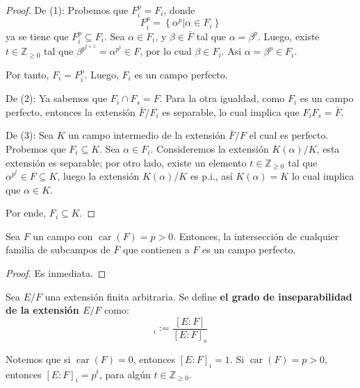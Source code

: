 \documentclass[12pt]{report}
\theoremstyle{largebreak}
\DeclareMathOperator{\car}{car}
\begin{document}
    \begin{proof}
        De (1): Probemos que $F_i^p=F_i$, donde
        \begin{equation*}
            F_i^p=\left\{\alpha^p|\alpha\in F_i\right\}
        \end{equation*}
        ya se tiene que $F_i^p\subseteq F_i$. Sea $\alpha\in F_i$, y $\beta\in \bar{F}$ tal que $\alpha=\beta^p$. Luego, existe $t\in\mathbb{Z}_{\geq0}$ tal que $\beta^{p^{t+1}}=\alpha^{p^t}\in F$, por lo cual $\beta\in F_i$. Asi $\alpha=\beta^p\in F_i$.

        Por tanto, $F_i=F_i^p$. Luego, $F_i$ es un campo perfecto.

        De (2): Ya sabemos que $F_i\cap F_s=F$. Para la otra igualdad, como $F_i$ es un campo perfecto, entonces la extensión $\bar{F}/F_i$ es separable, lo cual implica que $F_iF_s=\bar{F}$.

        De (3): Sea $K$ un campo intermedio de la extensión $\bar{F}/F$ el cual es perfecto. Probemos que $F_i\subseteq K$. Sea $\alpha\in F_i$. Consideremos la extensión $K(\alpha)/K$, esta extensión es separable; por otro lado, existe un elemento $t\in\mathbb{Z}_{\geq0}$ tal que $\alpha^{p^t}\in F\subseteq K$, luego la extensión $K(\alpha)/K$ es p.i., así $K(\alpha)=K$ lo cual implica que $\alpha\in K$.

        Por ende, $F_i\subseteq K$.
    \end{proof}

    \begin{cor}
        Sea $F$ un campo con $\car(F)=p>0$. Entonces, la intersección de cualquier familia de subcampos de $\bar{F}$ que contienen a $F$ es un campo perfecto.
    \end{cor}

    \begin{proof}
            Es inmediata.
    \end{proof}

    \begin{mydef}
        Sea $E/F$ una extensión finita arbitraria. Se define \textbf{el grado de inseparabilidad de la extensión $E/F$} como:
        \begin{equation*}
            [E:F]_i:=\frac{[E:F]}{[E:F]_s}
        \end{equation*}
        
        Notemos que si $\car(F)=0$, entonces $[E:F]_i=1$. Si $\car(F)=p>0$, entonces $[E:F]_i=p^t$, para algún $t\in\mathbb{Z}_{\geq0}$.
    \end{mydef}
\end{document}
